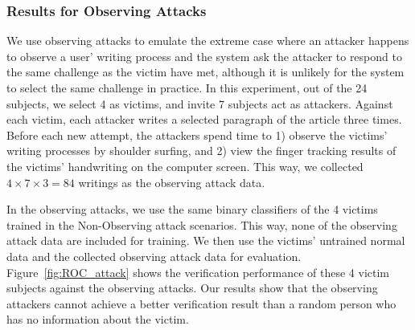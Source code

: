 %

\subsubsection{Results for Observing Attacks}

We use observing attacks to emulate the extreme case where an attacker happens to observe a user' writing process and the system ask the attacker to respond to the same challenge as the victim have met, although it is unlikely for the system to select the same challenge in practice.  In this experiment, out of the 24 subjects, we  select 4 as victims, and invite 7 subjects act as attackers. Against each victim, each attacker writes a selected paragraph of the article three times. Before each new attempt, the attackers spend time to 1) observe the victims' writing processes by shoulder surfing, 
and 2) view the finger tracking results of the victims' handwriting on the computer screen. This way, we collected $4\times 7 \times 3=84$ writings as the observing attack data. 

In the observing attacks, we use the same binary classifiers of the 4 victims trained in the Non-Observing attack scenarios. This way, none of the observing attack data are included for training. We then use the victims' untrained normal data and the collected observing attack data for evaluation. Figure~\ref{fig:ROC_attack} shows the verification performance of these 4 victim subjects against the observing attacks. Our results show that the observing attackers cannot achieve a better verification result than a random person who has no information about the victim.  



